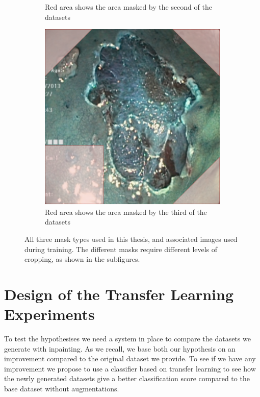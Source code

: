 \begin{figure}[h]
\begin{subfigure}[t]{0.37\textwidth}
         \caption{Red area shows the area masked by the second of the datasets}
         \label{fig:GreenMask}
     \end{subfigure}     
     \hspace*{2cm}
     \begin{subfigure}[t]{0.37\textwidth}
         \centering
         \includegraphics[width=\textwidth]{methodology/figures/bothmask.png}
         \caption{Red area shows the area masked by the third of the datasets}
         \label{fig:BothMask}
     \end{subfigure}
     \caption{All three mask types used in this thesis, and associated images used during training. The different masks require different levels of cropping, as shown in the subfigures.}
     \label{fig:masks}
\end{figure}


\FloatBarrier
\section{Design of the Transfer Learning Experiments}
\label{cha:classifier}
To test the hypothesises we need a system in place to compare the datasets we generate with inpainting. As we recall, we base both our hypothesis on an improvement compared to the original dataset we provide. 
To see if we have any improvement we propose to use a classifier based on transfer learning to see how the newly generated datasets give a better classification score compared to the base dataset without augmentations.

